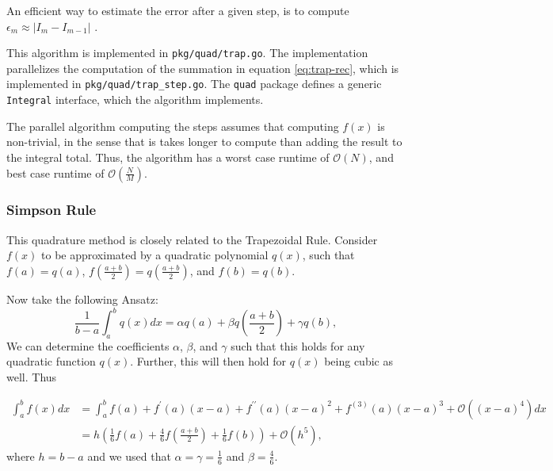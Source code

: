 \documentclass[10pt, a4paper]{article}
\begin{document}
  An efficient way to estimate the error after a given step, is to compute $\epsilon_m \approx |I_m - I_{m-1}|$
  \cite{nr}.

  This algorithm is implemented in \texttt{pkg/quad/trap.go}. The implementation parallelizes the computation
  of the summation in equation \ref{eq:trap-rec}, which is implemented in \texttt{pkg/quad/trap\_step.go}.
  The \texttt{quad} package defines a generic \texttt{Integral} interface, which the algorithm implements.

  The parallel algorithm computing the steps assumes that computing $f(x)$ is non-trivial, in the sense
  that is takes longer to compute than adding the result to the integral total. Thus, the
  algorithm has a worst case runtime of $\mathcal{O}(N)$, and best case runtime of $\mathcal{O}(\frac NM)$.

  \subsubsection{Simpson Rule}
  This quadrature method is closely related to the Trapezoidal Rule\footnotemark. Consider
  $f(x)$ to be approximated by a quadratic polynomial $q(x)$, such that $f(a) = q(a)$,
  $f(\frac{a+b}{2}) = q(\frac{a+b}{2})$, and $f(b) = q(b)$.


  Now take the following Ansatz:
  \begin{equation}
  \frac{1}{b-a} \int_a^b q(x) dx = \alpha q(a) + \beta q(\frac{a+b}{2}) + \gamma q(b),
  \end{equation}
  We can determine the coefficients $\alpha$, $\beta$, and $\gamma$ such that this holds for any
  quadratic function $q(x)$. Further, this will then hold for $q(x)$ being cubic as well. Thus

  \begin{equation}
  \begin{split}
  \int_a^b f(x) dx &= \int_a^b f(a) + f^\prime(a) (x-a) + f^{\prime\prime}(a) (x-a)^2 + f^{(3)}(a) (x-a)^3 + \mathcal{O}\left((x-a)^4\right) dx \\
  &= h \left( \frac{1}{6} f(a) + \frac{4}{6} f(\frac{a+b}{2}) + \frac{1}{6} f(b) \right) + \mathcal{O}(h^5),
  \end{split}
  \end{equation}
  where $h = b-a$ and we used that $\alpha = \gamma = \frac{1}{6}$ and $\beta = \frac{4}{6}$.
\end{document}
